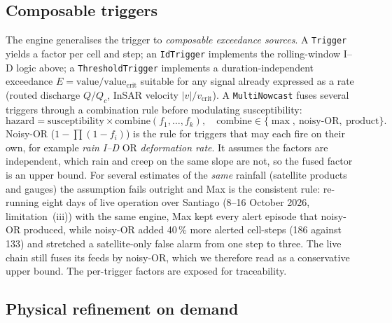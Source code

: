 \documentclass[authoryear,preprint,review,12pt]{elsarticle}
\begin{document}
\subsection{Composable triggers}

The engine generalises the trigger to \emph{composable exceedance sources}. A
\texttt{Trigger} yields a factor per cell and step; an \texttt{IdTrigger}
implements the rolling-window I--D logic above; a \texttt{ThresholdTrigger}
implements a duration-independent exceedance $E=\mathrm{value}/\mathrm{value_{crit}}$
suitable for any signal already expressed as a rate (routed discharge $Q/Q_c$,
InSAR velocity $|v|/v_{\mathrm{crit}}$). A \texttt{MultiNowcast} fuses several
triggers through a combination rule before modulating susceptibility:
\begin{equation}
\mathrm{hazard}=\mathrm{susceptibility}\times\mathrm{combine}(f_1,\ldots,f_k),
\quad\mathrm{combine}\in\{\max,\ \mathrm{noisy\text{-}OR},\ \mathrm{product}\}.
\label{eq:multi}
\end{equation}
Noisy-OR ($1-\prod(1-f_i)$) is the rule for triggers that may each fire on their
own, for example \emph{rain I--D} OR \emph{deformation rate}. It assumes the factors
are independent, which rain and creep on the same slope are not, so the fused factor
is an upper bound. For several estimates of the \emph{same} rainfall (satellite
products and gauges) the assumption fails outright and Max is the consistent rule:
re-running eight days of live operation over Santiago (8--16 October 2026, limitation~(iii)) with
the same engine, Max kept every alert episode that noisy-OR produced, while
noisy-OR added 40\,\% more alerted cell-steps (186 against 133) and stretched a
satellite-only false alarm from one step to three. The live chain still fuses its
feeds by noisy-OR, which we therefore read as a conservative upper bound. The
per-trigger factors are exposed for traceability.

\subsection{Physical refinement on demand}
\end{document}
